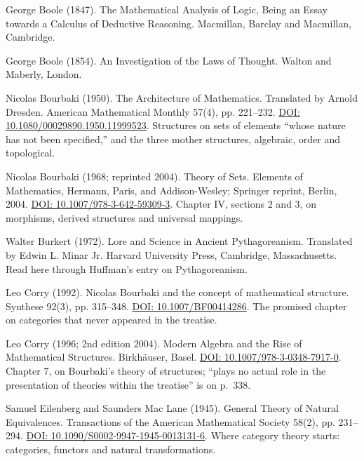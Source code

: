 \documentclass[11pt,twoside]{article}
\theoremstyle{thielethm}
\theoremstyle{thieledef}
\theoremstyle{thieledef}
\theoremstyle{thieledef}
\theoremstyle{thielethm}
\theoremstyle{thieleobs}
\theoremstyle{thielethm}
\begin{document}
\noindent George Boole (1847). The Mathematical Analysis of Logic, Being an Essay towards a Calculus of Deductive Reasoning. Macmillan, Barclay and Macmillan, Cambridge.
\par\medskip

\noindent George Boole (1854). An Investigation of the Laws of Thought. Walton and Maberly, London.
\par\medskip

\noindent Nicolas Bourbaki (1950). The Architecture of Mathematics. Translated by Arnold Dresden. American Mathematical Monthly 57(4), pp. 221--232. \href{https://doi.org/10.1080/00029890.1950.11999523}{DOI: 10.1080/00029890.1950.11999523}. Structures on sets of elements ``whose nature has not been specified,'' and the three mother structures, algebraic, order and topological.
\par\medskip

\noindent Nicolas Bourbaki (1968; reprinted 2004). Theory of Sets. Elements of Mathematics, Hermann, Paris, and Addison-Wesley; Springer reprint, Berlin, 2004. \href{https://doi.org/10.1007/978-3-642-59309-3}{DOI: 10.1007/978-3-642-59309-3}. Chapter IV, sections 2 and 3, on morphisms, derived structures and universal mappings.
\par\medskip

\noindent Walter Burkert (1972). Lore and Science in Ancient Pythagoreanism. Translated by Edwin L. Minar Jr. Harvard University Press, Cambridge, Massachusetts. Read here through Huffman's entry on Pythagoreanism.
\par\medskip

\noindent Leo Corry (1992). Nicolas Bourbaki and the concept of mathematical structure. Synthese 92(3), pp. 315--348. \href{https://doi.org/10.1007/BF00414286}{DOI: 10.1007/BF00414286}. The promised chapter on categories that never appeared in the treatise.
\par\medskip

\noindent Leo Corry (1996; 2nd edition 2004). Modern Algebra and the Rise of Mathematical Structures. Birkh\"auser, Basel. \href{https://doi.org/10.1007/978-3-0348-7917-0}{DOI: 10.1007/978-3-0348-7917-0}. Chapter 7, on Bourbaki's theory of structures; ``plays no actual role in the presentation of theories within the treatise'' is on p.~338.
\par\medskip

\noindent Samuel Eilenberg and Saunders Mac Lane (1945). General Theory of Natural Equivalences. Transactions of the American Mathematical Society 58(2), pp. 231--294. \href{https://doi.org/10.1090/S0002-9947-1945-0013131-6}{DOI: 10.1090/S0002-9947-1945-0013131-6}. Where category theory starts: categories, functors and natural transformations.
\par\medskip
\end{document}
